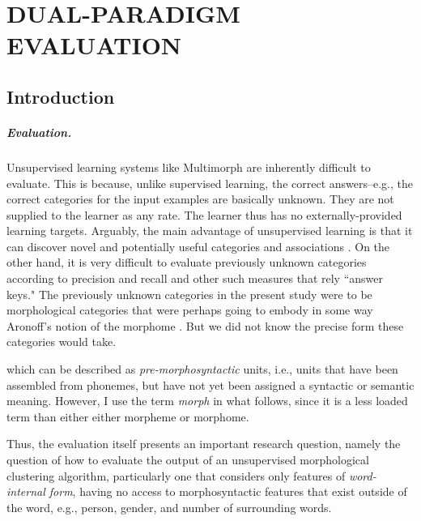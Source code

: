 \chapter{DUAL-PARADIGM EVALUATION}
\label{ch:eval}

\section{Introduction}

\paragraph{Evaluation.} Unsupervised learning systems like Multimorph are inherently difficult to evaluate. This is because, unlike supervised learning, the correct answers--e.g., the correct
categories for the input examples are basically unknown. They are not supplied to the learner as  any rate. The learner thus has no externally-provided learning targets. 
Arguably, the main advantage of unsupervised learning is that it can discover novel and potentially useful categories and associations \citep{parsons:2004}. On the other hand, it is very difficult to evaluate previously unknown categories according to precision and recall and other such measures that rely ``answer keys." 
The previously unknown categories in the present study were to be morphological 
categories that were perhaps going to embody in some way Aronoff's notion of the morphome \citep{aronoff:1994}.  But we did not know the precise form these categories would take. 



which can be described as 
\emph{pre-morphosyntactic} units, i.e., units that have been assembled from 
phonemes, but have not yet been assigned 
a syntactic or semantic meaning. However,  I use the term \emph{morph} in what follows, since it is a less loaded term than either
either morpheme or morphome.

Thus, the evaluation itself presents an important research question, namely the question 
of how to evaluate the output of an unsupervised morphological clustering algorithm, 
particularly one that considers only features of \emph{word-internal form}, having no 
access to morphosyntactic features that exist outside of the word, e.g., person, gender, and 
number of surrounding words.

